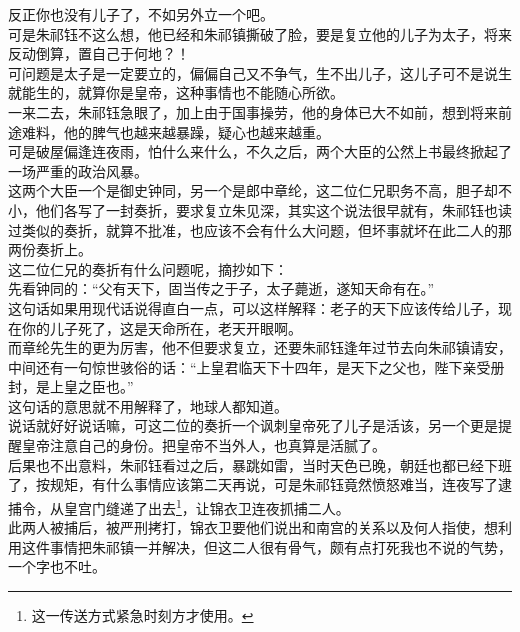 \begin{multicols}{\theparacolNo}
反正你也没有儿子了，不如另外立一个吧。\\

可是朱祁钰不这么想，他已经和朱祁镇撕破了脸，要是复立他的儿子为太子，将来反动倒算，置自己于何地？！\\

可问题是太子是一定要立的，偏偏自己又不争气，生不出儿子，这儿子可不是说生就能生的，就算你是皇帝，这种事情也不能随心所欲。\\

一来二去，朱祁钰急眼了，加上由于国事操劳，他的身体已大不如前，想到将来前途难料，他的脾气也越来越暴躁，疑心也越来越重。\\

可是破屋偏逢连夜雨，怕什么来什么，不久之后，两个大臣的公然上书最终掀起了一场严重的政治风暴。\\

这两个大臣一个是御史钟同，另一个是郎中章纶，这二位仁兄职务不高，胆子却不小，他们各写了一封奏折，要求复立朱见深，其实这个说法很早就有，朱祁钰也读过类似的奏折，就算不批准，也应该不会有什么大问题，但坏事就坏在此二人的那两份奏折上。\\

这二位仁兄的奏折有什么问题呢，摘抄如下：\\

先看钟同的：“父有天下，固当传之于子，太子薨逝，遂知天命有在。”\\

这句话如果用现代话说得直白一点，可以这样解释：老子的天下应该传给儿子，现在你的儿子死了，这是天命所在，老天开眼啊。\\

而章纶先生的更为厉害，他不但要求复立，还要朱祁钰逢年过节去向朱祁镇请安，中间还有一句惊世骇俗的话：“上皇君临天下十四年，是天下之父也，陛下亲受册封，是上皇之臣也。”\\

这句话的意思就不用解释了，地球人都知道。\\

说话就好好说话嘛，可这二位的奏折一个讽刺皇帝死了儿子是活该，另一个更是提醒皇帝注意自己的身份。把皇帝不当外人，也真算是活腻了。\\

后果也不出意料，朱祁钰看过之后，暴跳如雷，当时天色已晚，朝廷也都已经下班了，按规矩，有什么事情应该第二天再说，可是朱祁钰竟然愤怒难当，连夜写了逮捕令，从皇宫门缝递了出去\footnote{这一传送方式紧急时刻方才使用。}，让锦衣卫连夜抓捕二人。\\

此两人被捕后，被严刑拷打，锦衣卫要他们说出和南宫的关系以及何人指使，想利用这件事情把朱祁镇一并解决，但这二人很有骨气，颇有点打死我也不说的气势，一个字也不吐。\\


\end{multicols}
